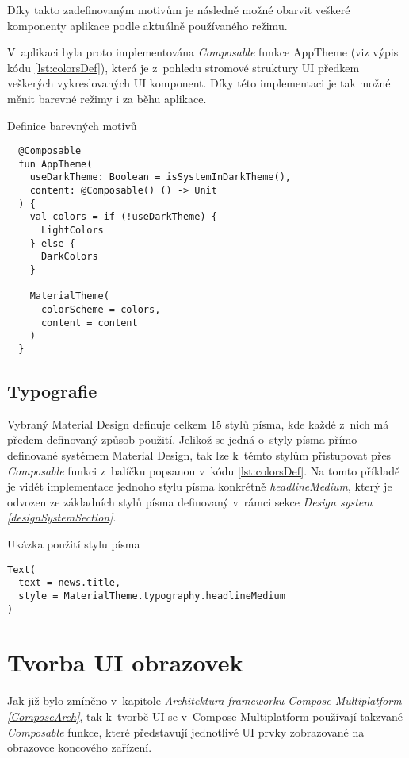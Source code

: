 Díky takto zadefinovaným motivům je následně možné obarvit veškeré komponenty aplikace podle aktuálně používaného režimu.

V~aplikaci byla proto implementována \textit{Composable} funkce AppTheme (viz výpis kódu \ref{lst:colorsDef}), která je z~pohledu stromové struktury
UI předkem veškerých vykreslovaných UI komponent. Díky této implementaci je tak možné měnit barevné režimy i za běhu aplikace. 
\begin{listing}[H]
\caption{Definice barevných motivů}\label{lst:colorsDef}
\begin{verbatim}
  @Composable
  fun AppTheme(
    useDarkTheme: Boolean = isSystemInDarkTheme(),
    content: @Composable() () -> Unit
  ) {
    val colors = if (!useDarkTheme) {
      LightColors
    } else {
      DarkColors
    }
  
    MaterialTheme(
      colorScheme = colors,
      content = content
    )
  }
\end{verbatim}
\end{listing}


\subsection*{Typografie}
Vybraný Material Design definuje celkem 15 stylů písma, kde každé z~nich má předem definovaný způsob použití. \cite{material3} 
Jelikož se jedná o~styly písma přímo definované systémem Material Design, tak lze k~těmto stylům přistupovat přes
\textit{Composable} funkci  z~balíčku  popsanou v~kódu \ref{lst:colorsDef}.
Na tomto příkladě je vidět implementace jednoho stylu písma konkrétně \textit{headlineMedium}, který je odvozen ze základních stylů písma 
definovaný v~rámci sekce \textit{Design system \ref{designSystemSection}}.

\begin{listing}[H]
\caption{Ukázka použití stylu písma}\label{lst:typographyExample}
\begin{verbatim}
Text(
  text = news.title,
  style = MaterialTheme.typography.headlineMedium
)
\end{verbatim}
\end{listing}

\section{Tvorba UI obrazovek}
Jak již bylo zmíněno v~kapitole \textit{Architektura frameworku Compose Multiplatform \ref{ComposeArch}}, tak k~tvorbě UI se v~Compose Multiplatform 
používají takzvané \textit{Composable} funkce, které představují jednotlivé UI prvky zobrazované na obrazovce koncového zařízení. 

